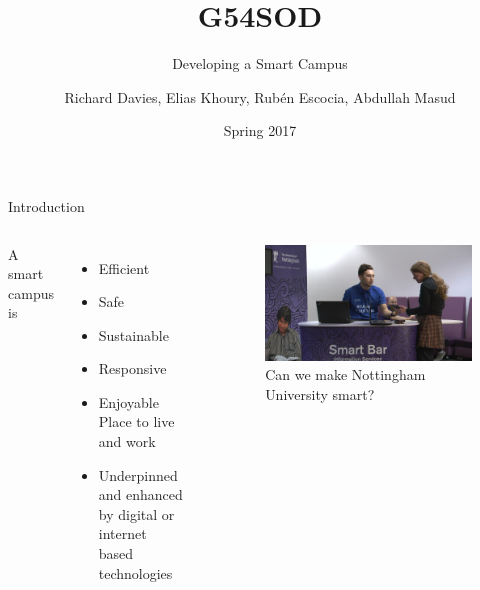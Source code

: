 \documentclass[18pt]{beamer}
\title{G54SOD}
\subtitle{Developing a Smart Campus}
\date{Spring 2017}
\author{Richard Davies, Elias Khoury, Rub\'{e}n Escocia, Abdullah Masud}
\institute{The University of Nottingham}
\begin{document}
    \graphicspath{ {images/} }
    \maketitle

    \begin{frame}{Introduction}
        \begin{columns}
                A smart campus is
                \begin{itemize}
                    \item Efficient \pause
                    \item Safe \pause
                    \item Sustainable \pause
                    \item Responsive \pause
                    \item Enjoyable Place to live and work \pause
                    \item Underpinned and enhanced by digital or internet based technologies
                \end{itemize} \cite{Misc:uonsmartcampus}
                \begin{figure}
                \includegraphics[width=0.99\columnwidth]{smart}
                \caption{Can we make Nottingham University smart?}
                \end{figure}
        \end{columns}
    \end{frame}
\end{document}
